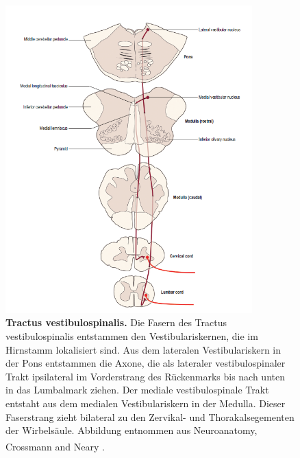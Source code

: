 \documentclass[12pt,a4paper,pdftex]{article}
\begin{document}
\begin{figure}[H]
    \centering
    \includegraphics[width=0.85\textwidth]{pictures/Bilder_Laura/vestibulospinal_tract.PNG}
    \caption[Tractus vestibulospinalis]{\textbf{Tractus vestibulospinalis.} Die Fasern des Tractus vestibulospinalis entstammen den Vestibulariskernen, die im Hirnstamm lokalisiert sind. Aus dem lateralen Vestibulariskern in der Pons entstammen die Axone, die als lateraler vestibulospinaler Trakt ipsilateral im Vorderstrang des Rückenmarks bis nach unten in das Lumbalmark ziehen. Der mediale vestibulospinale Trakt entstaht aus dem medialen Vestibulariskern in der Medulla. Dieser Faserstrang zieht bilateral zu den Zervikal- und Thorakalsegementen der Wirbelsäule. Abbildung entnommen aus Neuroanatomy, Crossmann and Neary \textsuperscript{\cite[8]{crossman2014neuroanatomy}}.}
    \label{fig:tr_vestibulospinalis}
\end{figure}
\end{document}
